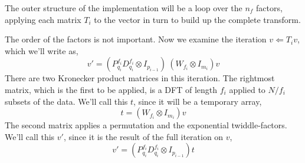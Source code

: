 \documentclass[fleqn,12pt]{article}
\newenvironment{algorithm}{\begin{quote} %
\begin{algorithmic}\samepage}{\end{algorithmic} %
\end{quote}}
\begin{document}
The outer structure of the implementation will be a loop over the
$n_f$ factors, applying each matrix $T_i$ to the vector in turn to
build up the complete transform.
%
\begin{algorithm}
\ENDFOR
\end{algorithm}
%
The order of the factors is not important. Now we examine the iteration
$v \Leftarrow T_i v$, which we'll write as,
%
\begin{equation}
v' = 
(P^{f_i}_{q_i} D^{f_i}_{q_i} \otimes I_{p_{i-1}}) ~
( W_{f_i} \otimes I_{m_i}) v
\end{equation}
%
There are two Kronecker product matrices in this iteration. The
rightmost matrix, which is the first to be applied, is a DFT of length
$f_i$ applied to $N/f_i$ subsets of the data. We'll call this $t$,
since it will be a temporary array,
%
\begin{equation}
t = (W_{f_i} \otimes I_{m_i}) v
\end{equation}
%
The second matrix applies a permutation and the exponential
twiddle-factors. We'll call this $v'$, since it is the result of the
full iteration on $v$,
%
\begin{equation}
v' = (P^{f_i}_{q_i} D^{f_i}_{q_i} \otimes I_{p_{i-1}}) t 
\end{equation}
\end{document}
